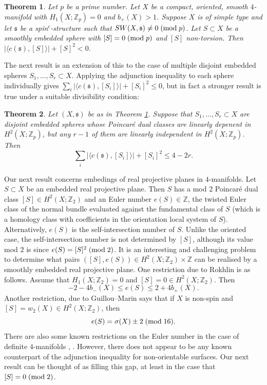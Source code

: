 \documentclass{amsart}
\newtheorem{theorem}{Theorem}[section]
\theoremstyle{definition}
\theoremstyle{remark}
\numberwithin{equation}{section}
\begin{document}
\begin{theorem}\label{thm:1sph}
Let $p$ be a prime number. Let $X$ be a compact, oriented, smooth $4$-manifold with $H_1(X ; \mathbb{Z}_p) = 0$ and $b_+(X) > 1$. Suppose $X$ is of simple type and let $\mathfrak{s}$ be a spin$^c$-structure such that $SW(X , \mathfrak{s}) \neq 0 \; ({\rm mod} \; p)$. Let $S \subset X$ be a smoothly embedded sphere with $[S] = 0 \; ({\rm mod} \; p)$ and $[S]$ non-torsion. Then $| \langle c(\mathfrak{s}) , [S] \rangle | + [S]^2 < 0$.
\end{theorem}

The next result is an extension of this to the case of multiple disjoint embedded spheres $S_1, \dots , S_r \subset X$. Applying the adjunction inequality to each sphere individually gives $\sum_i |\langle c(\mathfrak{s}) , [S_i] \rangle | + [S_i]^2 \le 0$, but in fact a stronger result is true under a suitable divisibility condition:

\begin{theorem}\label{thm:2sph}
Let $(X,\mathfrak{s})$ be as in Theorem \ref{thm:1sph}. Suppose that $S_1, \dots , S_r \subset X$ are disjoint embedded spheres whose Poincar\'e dual classes are linearly depenent in $H^2(X ; \mathbb{Z}_p)$, but any $r-1$ of them are linearly independent in $H^2(X ; \mathbb{Z}_p)$. Then 
\[
\sum_i | \langle c(\mathfrak{s}) , [S_i] \rangle | + [S_i]^2 \le 4 - 2r.
\]
\end{theorem}

Our next result concerns embedings of real projective planes in $4$-manifolds. Let $S \subset X$ be an embedded real projective plane. Then $S$ has a mod $2$ Poincar\'e dual class $[S] \in H^2(X ; \mathbb{Z}_2)$ and an Euler number $e(S) \in \mathbb{Z}$, the twisted Euler class of the normal bundle evaluated against the fundamental class of $S$ (which is a homology class with coefficients in the orientation local system of $S$). Alternatively, $e(S)$ is the self-intersection number of $S$. Unlike the oriented case, the self-intersection number is not determined by $[S]$, although its value mod $2$ is since $e(S) = [S]^2 \; ({\rm mod} \; 2)$. It is an interesting and challenging problem to determine what pairs $([S] , e(S)) \in H^2(X ; \mathbb{Z}_2) \times \mathbb{Z}$ can be realised by a smoothly embedded real projective plane. One restriction due to Rokhlin \cite{rok} is as follows. Assume that $H_1(X ; \mathbb{Z}_2) = 0$ and $[S] = 0 \in H^2(X ; \mathbb{Z}_2)$. Then
\[
-2 - 4b_-(X) \le e(S) \le 2 + 4b_+(X).
\]
Another restriction, due to Guillou--Marin \cite{gm} says that if $X$ is non-spin and $[S] = w_2(X) \in H^2(X ; \mathbb{Z}_2)$, then 
\[
e(S) = \sigma(X) \pm 2 \; ({\rm mod} \; 16).
\]
There are also some known restrictions on the Euler number in the case of definite $4$-manifolds \cite{law}, \cite{lrs}. However, there does not appear to be any known counterpart of the adjunction inequality for non-orientable surfaces. Our next result can be thought of as filling this gap, at least in the case that $[S] = 0 \; ({\rm mod} \; 2)$.
\end{document}
